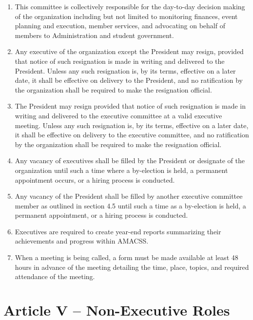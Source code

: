 \documentclass[12pt,a4paper]{article}
\begin{document}
\begin{enumerate}
\item This committee is collectively responsible for the day-to-day decision making of the organization including but not limited to monitoring finances, event planning and execution, member services, and advocating on behalf of members to Administration and student government.

\item Any executive of the organization except the President may resign, provided that notice of such resignation is made in writing and delivered to the President. Unless any such resignation is, by its terms, effective on a later date, it shall be effective on delivery to the President, and no ratification by the organization shall be required to make the resignation official.

\item The President may resign provided that notice of such resignation is made in writing and delivered to the executive committee at a valid executive meeting. Unless any such resignation is, by its terms, effective on a later date, it shall be effective on delivery to the executive committee, and no ratification by the organization shall be required to make the resignation official.

\item Any vacancy of executives shall be filled by the President or designate of the organization until such a time where a by-election is held, a permanent appointment occurs, or a hiring process is conducted.

\item Any vacancy of the President shall be filled by another executive committee member as outlined in section 4.5 until such a time as a by-election is held, a permanent appointment, or a hiring process is conducted.

\item Executives are required to create year-end reports summarizing their achievements and progress within AMACSS.

\item When a meeting is being called, a form must be made available at least 48 hours in advance of the meeting detailing the time, place, topics, and required attendance of the meeting.
\end{enumerate}

\section*{Article V – Non-Executive Roles}
\end{document}
